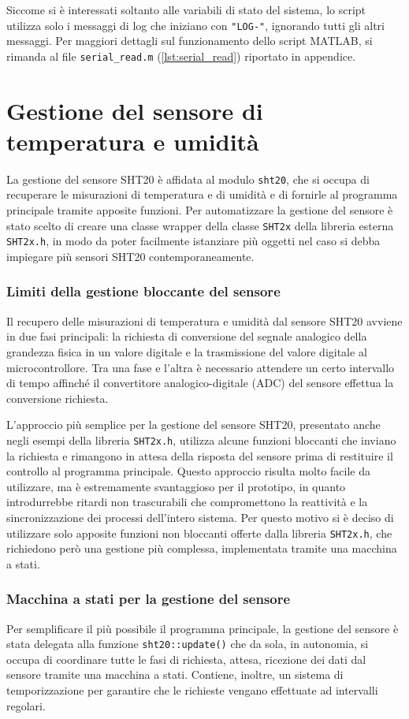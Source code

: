 Siccome si è interessati soltanto alle variabili di stato del sistema, lo script utilizza solo i messaggi di log che iniziano
con \verb|"LOG-"|, ignorando tutti gli altri messaggi. Per maggiori dettagli sul funzionamento dello script MATLAB, si rimanda
al file \verb|serial_read.m| (\autoref{lst:serial_read}) riportato in appendice.

\section{Gestione del sensore di temperatura e umidità}
La gestione del sensore SHT20 è affidata al modulo \verb|sht20|, che si occupa di recuperare le misurazioni di temperatura
e di umidità e di fornirle al programma principale tramite apposite funzioni. Per automatizzare la gestione del sensore
è stato scelto di creare una classe wrapper della classe \verb|SHT2x| della libreria esterna \verb|SHT2x.h|, in modo da
poter facilmente istanziare più oggetti nel caso si debba impiegare più sensori SHT20 contemporaneamente.

\subsubsection{Limiti della gestione bloccante del sensore}
Il recupero delle misurazioni di temperatura e umidità dal sensore SHT20 avviene in due fasi principali: la richiesta di
conversione del segnale analogico della grandezza fisica in un valore digitale e la trasmissione del valore digitale al
microcontrollore. Tra una fase e l'altra è necessario attendere un certo intervallo di tempo affinché il convertitore
analogico-digitale (ADC) del sensore effettua la conversione richiesta.

L'approccio più semplice per la gestione del sensore SHT20, presentato anche negli esempi della libreria \verb|SHT2x.h|,
utilizza alcune funzioni bloccanti che inviano la richiesta e rimangono in attesa della risposta del sensore prima di
restituire il controllo al programma principale. Questo approccio risulta molto facile da utilizzare, ma è estremamente
svantaggioso per il prototipo, in quanto introdurrebbe ritardi non trascurabili che compromettono la reattività e la
sincronizzazione dei processi dell'intero sistema. Per questo motivo si è deciso di utilizzare solo apposite funzioni
non bloccanti offerte dalla libreria \verb|SHT2x.h|, che richiedono però una gestione più complessa, implementata tramite
una macchina a stati.

\subsubsection{Macchina a stati per la gestione del sensore}
Per semplificare il più possibile il programma principale, la gestione del sensore è stata delegata alla funzione
\verb|sht20::update()| che da sola, in autonomia, si occupa di coordinare tutte le fasi di richiesta, attesa, ricezione
dei dati dal sensore tramite una macchina a stati.  Contiene, inoltre, un sistema di temporizzazione per garantire che
le richieste vengano effettuate ad intervalli regolari.

